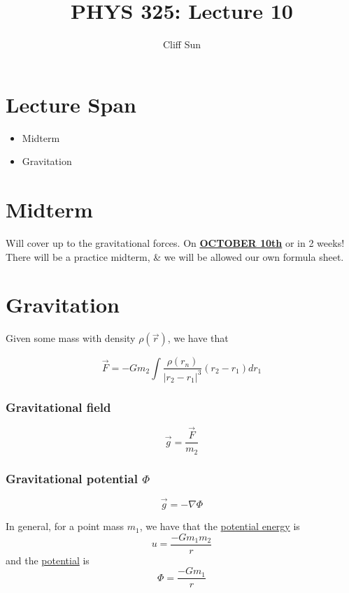 \documentclass{article}
\title{PHYS 325: Lecture 10}
\author{Cliff Sun}
\newtheorem{one minute paper}[theorem]{One Minute Paper}
\begin{document}
\maketitle

\section*{Lecture Span}
\begin{itemize}
    \item Midterm
    \item Gravitation
\end{itemize}

\section*{Midterm}

Will cover up to the gravitational forces. On \textbf{\underline{OCTOBER 10th}} or in 2 weeks! There will be a practice midterm, \& we will be allowed
our own formula sheet. 

\section*{Gravitation}

Given some mass with density $\rho(\vec{r})$, we have that

\begin{equation}
    \vec{F} = -Gm_2 \int \frac{\rho(r_n)}{|r_2-r_1|^3}(r_2-r_1)dr_1
\end{equation}

\subsubsection*{Gravitational field} 

\begin{equation}
    \vec{g} = \frac{\vec{F}}{m_2}
\end{equation}

\subsubsection*{Gravitational potential $\Phi$}

\begin{equation}
    \vec{g} = -\nabla\Phi
\end{equation}

In general, for a point mass $m_1$, we have that the \underline{potential energy} is 
\begin{equation}
    u = \frac{-Gm_1m_2}{r}
\end{equation}
and the \underline{potential} is 
\begin{equation}
    \Phi = \frac{-Gm_1}{r}
\end{equation}
\end{document}
